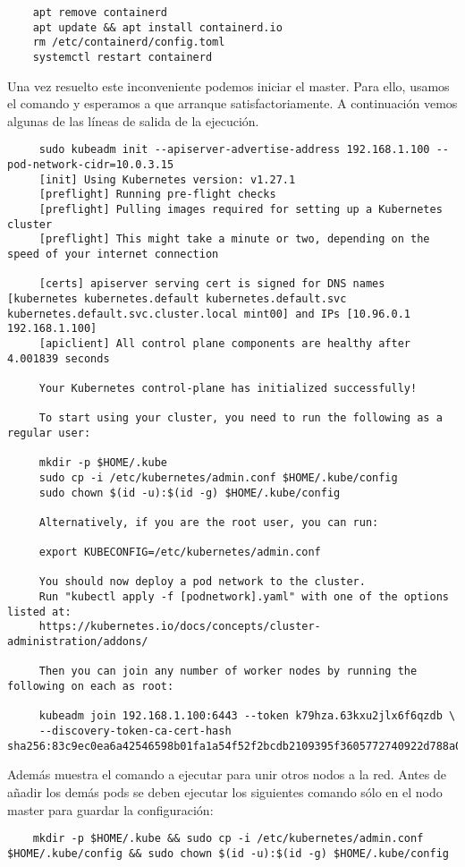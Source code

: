 \documentclass[../main.tex]{subfiles}
\begin{document}
\begin{lstlisting}
	apt remove containerd 
	apt update && apt install containerd.io 
	rm /etc/containerd/config.toml 
	systemctl restart containerd 
\end{lstlisting}

Una vez resuelto este inconveniente podemos iniciar el master. Para ello, usamos el comando y esperamos a que arranque satisfactoriamente. A continuación vemos algunas de las líneas de salida de la ejecución.

\begin{lstlisting}
	 sudo kubeadm init --apiserver-advertise-address 192.168.1.100 --pod-network-cidr=10.0.3.15
	 [init] Using Kubernetes version: v1.27.1
	 [preflight] Running pre-flight checks
	 [preflight] Pulling images required for setting up a Kubernetes cluster
	 [preflight] This might take a minute or two, depending on the speed of your internet connection
	 
	 [certs] apiserver serving cert is signed for DNS names [kubernetes kubernetes.default kubernetes.default.svc kubernetes.default.svc.cluster.local mint00] and IPs [10.96.0.1 192.168.1.100]
	 [apiclient] All control plane components are healthy after 4.001839 seconds
	 	 
	 Your Kubernetes control-plane has initialized successfully!
	 
	 To start using your cluster, you need to run the following as a regular user:
	 
	 mkdir -p $HOME/.kube
	 sudo cp -i /etc/kubernetes/admin.conf $HOME/.kube/config
	 sudo chown $(id -u):$(id -g) $HOME/.kube/config
	 
	 Alternatively, if you are the root user, you can run:
	 
	 export KUBECONFIG=/etc/kubernetes/admin.conf
	 
	 You should now deploy a pod network to the cluster.
	 Run "kubectl apply -f [podnetwork].yaml" with one of the options listed at:
	 https://kubernetes.io/docs/concepts/cluster-administration/addons/
	 
	 Then you can join any number of worker nodes by running the following on each as root:
	 
	 kubeadm join 192.168.1.100:6443 --token k79hza.63kxu2jlx6f6qzdb \
	 --discovery-token-ca-cert-hash sha256:83c9ec0ea6a42546598b01fa1a54f52f2bcdb2109395f3605772740922d788a0
\end{lstlisting}
Además muestra el comando a ejecutar para unir otros nodos a la red.
Antes de añadir los demás pods se deben ejecutar los siguientes comando sólo en el nodo master para guardar la configuración:
\begin{lstlisting}
	mkdir -p $HOME/.kube && sudo cp -i /etc/kubernetes/admin.conf $HOME/.kube/config && sudo chown $(id -u):$(id -g) $HOME/.kube/config
\end{lstlisting}
\end{document}

